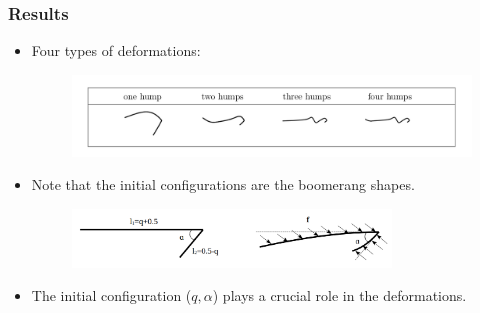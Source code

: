 \documentclass{beamer}
\begin{document}
\begin{frame}
	\frametitle{Results}
	\begin{overlayarea}{\textwidth}{\textheight}
\begin{itemize}
	\item Four types of deformations: \vspace{-0.3cm}
	\begin{figure}[htb]
		\begin{center}
			\includegraphics[width=1\textwidth]{plots/deformations.png}
		\end{center}
	\end{figure}
	\item Note that the initial configurations are the boomerang shapes.
		\begin{figure}[htb]
		\begin{center}
			\includegraphics[width=0.8\textwidth]{plots/geometry.png}
		\end{center}
	\end{figure}
	\item The initial configuration ($q,\alpha$) plays a crucial role in the deformations.
\end{itemize}
	\end{overlayarea}
\end{frame}

\end{document}

